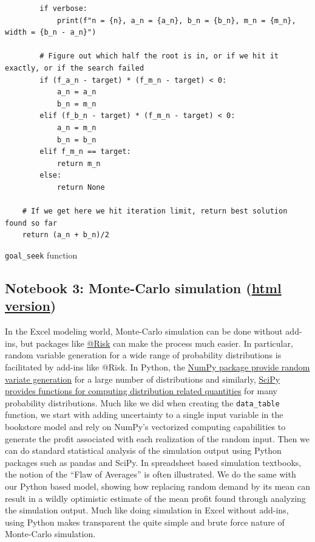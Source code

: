 \documentclass[ited]{informs3}                      %
\newcommand{\code}[1]{\texttt{#1}}
\begin{document}
\begin{listing}
\begin{verbatim}
        if verbose:
            print(f"n = {n}, a_n = {a_n}, b_n = {b_n}, m_n = {m_n}, width = {b_n - a_n}")

        # Figure out which half the root is in, or if we hit it exactly, or if the search failed
        if (f_a_n - target) * (f_m_n - target) < 0:
            a_n = a_n
            b_n = m_n
        elif (f_b_n - target) * (f_m_n - target) < 0:
            a_n = m_n
            b_n = b_n
        elif f_m_n == target:
            return m_n
        else:
            return None
    
    # If we get here we hit iteration limit, return best solution found so far
    return (a_n + b_n)/2
\end{verbatim}
\caption{\code{goal\_seek} function}
\label{fig:goal_seek_function}
\end{listing}

\subsection{Notebook 3: Monte-Carlo simulation (\href{http://www.sba.oakland.edu/faculty/isken/excel_with_python/what_if_3_simulation.html}{html version})}

In the Excel modeling world, Monte-Carlo simulation can be done without add-ins, but packages like \href{https://lumivero.com/products/at-risk/}{@Risk} can make the process much easier. In particular, random variable generation for a wide range of probability distributions is facilitated by add-ins like @Risk. In Python, the \href{https://numpy.org/doc/stable/reference/random/generator.html}{NumPy package provide random variate generation} for a large number of distributions and similarly, \href{https://docs.scipy.org/doc/scipy/reference/stats.html}{SciPy provides functions for computing distribution related quantities} for many probability distributions. Much like we did when creating the \code{data\_table} function, we start with adding uncertainty to a single input variable in the bookstore model and rely on NumPy's vectorized computing capabilities to generate the profit associated with each realization of the random input. Then we can do standard statistical analysis of the simulation output using Python packages such as pandas and SciPy. In spreadsheet based simulation textbooks, the notion of the ``Flaw of Averages'' \citep{savageFlawAveragesWhy2012} is often illustrated. We do the same with our Python based model, showing how replacing random demand by its mean can result in a wildly optimistic estimate of the mean profit found through analyzing the simulation output. Much like doing simulation in Excel without add-ins, using Python makes transparent the quite simple and brute force nature of Monte-Carlo simulation.
\end{document}
